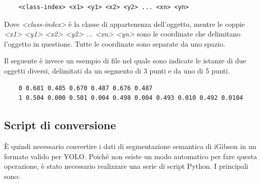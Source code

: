 \documentclass[12pt]{report}
\begin{document}
\begin{verbatim}
	<class-index> <x1> <y1> <x2> <y2> ... <xn> <yn>
\end{verbatim}

Dove \textit{<class-index>} è la classe di appartenenza dell'oggetto, mentre le coppie \textit{<x1> <y1> <x2> <y2> ... <xn> <yn>} sono le coordinate che delimitano l'oggetto in questione. Tutte le coordinate sono separate da uno spazio.

Il seguente è invece un esempio di file nel quale sono indicate le istanze di due oggetti diversi, delimitati da un segmento di 3 punti e da uno di 5 punti.

\begin{verbatim}
	0 0.681 0.485 0.670 0.487 0.676 0.487
	1 0.504 0.000 0.501 0.004 0.498 0.004 0.493 0.010 0.492 0.0104
\end{verbatim}

\subsection{Script di conversione}
\label{chap:script_di_conversione_igibson}

È quindi necessario convertire i dati di segmentazione semantica di iGibson in un formato valido per YOLO. Poichè non esiste un modo automatico per fare questa operazione, è stato necessario realizzare una serie di script Python. I principali sono:
\end{document}
